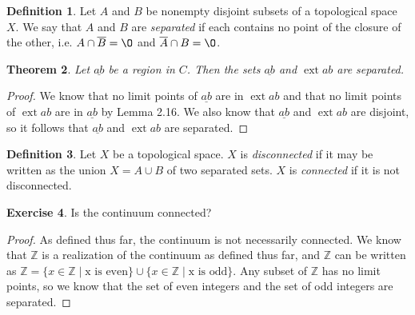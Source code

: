 \documentclass[12pt]{article}
\renewcommand{\emptyset}{\O}
\renewcommand{\_}[1]{\underline{ #1 }}
\DeclareMathOperator{\ext}{ext}
\newtheorem{theorem}{Theorem}[section]
\theoremstyle{definition}
\newtheorem{definition}[theorem]{Definition}
\newtheorem{exercise}[theorem]{Exercise}
\numberwithin{equation}{subsection}
\begin{document}
\begin{definition}  Let $A$ and $B$ be nonempty disjoint subsets of a topological space $X$.  We say that $A$ and $B$ are \emph{separated} if each contains no point of the closure of the other, i.e. $A \cap \overline{B} = \emptyset$ and $\overline{A} \cap B = \emptyset$.
\end{definition}

\begin{theorem}  Let $\_{ab}$ be a region in $C$.  Then the sets $\_{ab}$ and $\ext{ab}$ are separated.
\end{theorem}

\begin{proof}
We know that no limit points of $\_{ab}$ are in $\ext{ab}$ and that no limit points of $\ext{ab}$ are in $\_{ab}$ by Lemma 2.16. We also know that $\_{ab}$ and $\ext{ab}$ are disjoint, so it follows that $\_{ab}$ and $\ext{ab}$ are separated.
\end{proof}

\begin{definition}  Let $X$ be a topological space.  $X$ is \emph{disconnected} if it may be written as the union $X = A \cup B$ of two separated sets.  $X$ is \emph{connected} if it is not disconnected.
\end{definition}

\begin{exercise} Is the continuum connected?
\end{exercise}

\begin{proof}
As defined thus far, the continuum is not necessarily connected. We know that $\mathbb Z$ is a realization of the continuum as defined thus far, and $\mathbb Z$ can be written as $\mathbb Z = \{x \in \mathbb Z \mid \text{x is even}\} \cup \{x \in \mathbb Z \mid \text{x is odd}\}$. Any subset of $\mathbb Z$ has no limit points, so we know that  the set of even integers and the set of odd integers are separated.
\end{proof}
\end{document}
